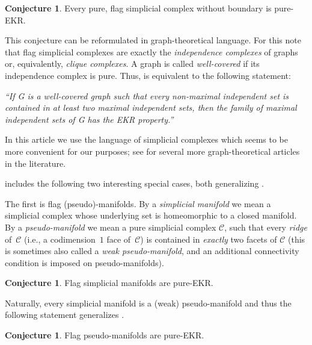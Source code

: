 \documentclass[a4paper,12pt]{amsart}
\theoremstyle{plain}
\theoremstyle{definition}
\newtheorem{conjecture}[theorem]{Conjecture}
\newcommand{\darkred}{\color{darkred}} %
\newcommand{\C}{\mathcal C}
\newcommand{\defn}[1]{\emph{\darkred #1}} %
\begin{document}
\begin{conjecture}
\label{conj:no_free_ridges}
  Every pure, flag simplicial complex without boundary is pure-EKR.
\end{conjecture}

This conjecture can be reformulated in graph-theoretical language. For this note that 
flag simplicial complexes are exactly the \defn{independence complexes} of graphs or, equivalently, \defn{clique complexes}.
A graph is called \defn{well-covered} if its independence complex is pure.
Thus,
 is equivalent to the following statement:

\smallskip

\emph{``If G is a well-covered graph such that every non-maximal independent set is contained in at least two maximal independent sets, then the family of maximal independent sets of G has the EKR property.''}

\smallskip

In this article we use the language of simplicial complexes which seems to be more convenient for our purposes; see  for several more graph-theoretical articles in the literature.

\medskip

 includes the following two interesting special cases, both generalizing .

The first is  flag (pseudo)-manifolds. By a \defn{simplicial manifold} we mean a simplicial complex whose underlying set is homeomorphic to a closed manifold. By a \defn{pseudo-manifold} we mean a pure simplicial complex $\C$, such that every \defn{ridge} of~$\C$ (i.e., a codimension~$1$ face of~$\C$) is contained in \emph{exactly} two facets of $\C$ (this is sometimes also called a \defn{weak pseudo-manifold}, and an additional connectivity condition is imposed on pseudo-manifolds). 

\begin{conjecture}
\label{conj:manifolds}
  Flag simplicial manifolds are pure-EKR.
\end{conjecture}

Naturally, every simplicial manifold is a (weak) pseudo-manifold and thus the following statement generalizes .

\begin{conjecture}
\label{conj:pseudo-manifolds}
  Flag pseudo-manifolds are pure-EKR.
\end{conjecture}
\end{document}
